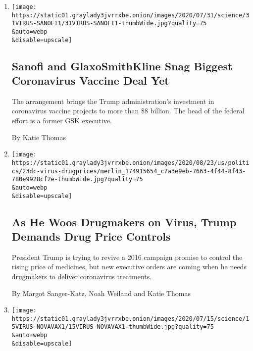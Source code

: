\begin{enumerate}
\def\labelenumi{\arabic{enumi}.}
\item
  \href{/2020/07/31/health/covid-19-vaccine-sanofi-gsk.html}{}

  \texttt{[image: https://static01.graylady3jvrrxbe.onion/images/2020/07/31/science/31VIRUS-SANOFI1/31VIRUS-SANOFI1-thumbWide.jpg?quality=75\\\&auto=webp\\\&disable=upscale]}

  \hypertarget{sanofi-and-glaxosmithkline-snag-biggest-coronavirus-vaccine-deal-yet}{%
  \subsection{Sanofi and GlaxoSmithKline Snag Biggest Coronavirus
  Vaccine Deal
  Yet}\label{sanofi-and-glaxosmithkline-snag-biggest-coronavirus-vaccine-deal-yet}}

  The arrangement brings the Trump administration's investment in
  coronavirus vaccine projects to more than \$8 billion. The head of the
  federal effort is a former GSK executive.

  By Katie Thomas
\item
  \href{/2020/07/24/us/politics/trump-drug-prices-coronavirus.html}{}

  \texttt{[image: https://static01.graylady3jvrrxbe.onion/images/2020/08/23/us/politics/23dc-virus-drugprices/merlin\_174915654\_c7a3e9eb-7663-4f44-8f43-780e9928cf2e-thumbWide.jpg?quality=75\\\&auto=webp\\\&disable=upscale]}

  \hypertarget{as-he-woos-drugmakers-on-virus-trump-demands-drug-price-controls}{%
  \subsection{As He Woos Drugmakers on Virus, Trump Demands Drug Price
  Controls}\label{as-he-woos-drugmakers-on-virus-trump-demands-drug-price-controls}}

  President Trump is trying to revive a 2016 campaign promise to control
  the rising price of medicines, but new executive orders are coming
  when he needs drugmakers to deliver coronavirus treatments.

  By Margot Sanger-Katz, Noah Weiland and Katie Thomas
\item
  \href{/2020/07/16/health/coronavirus-vaccine-novavax.html}{}

  \texttt{[image: https://static01.graylady3jvrrxbe.onion/images/2020/07/15/science/15VIRUS-NOVAVAX1/15VIRUS-NOVAVAX1-thumbWide.jpg?quality=75\\\&auto=webp\\\&disable=upscale]}


\end{enumerate}
